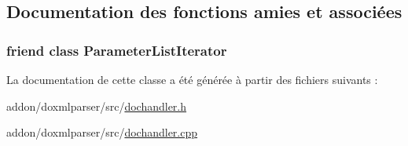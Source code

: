 \subsection{Documentation des fonctions amies et associées}
\hypertarget{class_parameter_list_handler_a6ec6d833a9d9c09a3b8e37a69549ad9c}{}
\subsubsection[{Parameter\+List\+Iterator}]{\setlength{\rightskip}{0pt plus 5cm}friend class {\bf Parameter\+List\+Iterator}\hspace{0.3cm}{\ttfamily [friend]}}\label{class_parameter_list_handler_a6ec6d833a9d9c09a3b8e37a69549ad9c}


La documentation de cette classe a été générée à partir des fichiers suivants \+:\begin{DoxyCompactItemize}
\item 
addon/doxmlparser/src/\hyperlink{dochandler_8h}{dochandler.\+h}\item 
addon/doxmlparser/src/\hyperlink{dochandler_8cpp}{dochandler.\+cpp}\end{DoxyCompactItemize}
